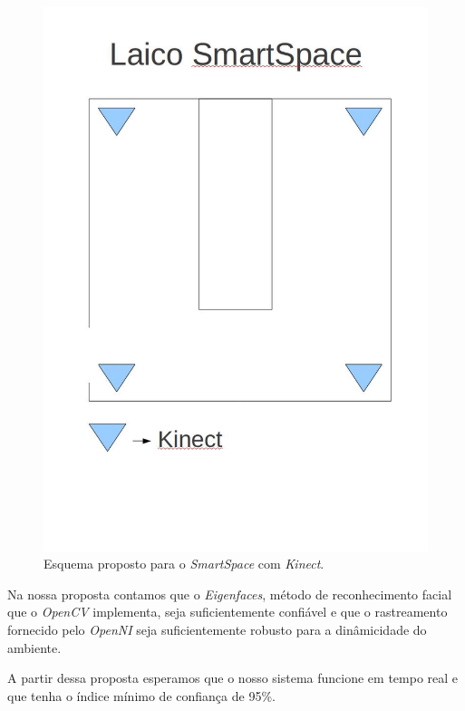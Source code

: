 	\begin{figure}[hbt]
		\begin{center}
			\includegraphics[scale=0.3]{figuras/4.ProblemaEProposta/esquemaSmartSpaceProposto.jpg}
		\end{center}
		\caption{Esquema proposto para o \textit{SmartSpace} com \textit{Kinect}.}
		\label{smartSpaceProposto}
	\end{figure}

	Na nossa proposta contamos que o \textit{Eigenfaces}, método de reconhecimento facial que o \textit{OpenCV} implementa, seja suficientemente confiável e que o rastreamento fornecido pelo \textit{OpenNI} seja suficientemente robusto para a dinâmicidade do ambiente.

	A partir dessa proposta esperamos que o nosso sistema funcione em tempo real e que tenha o índice mínimo de confiança de 95\%. 